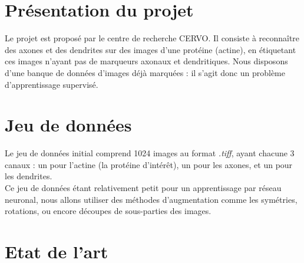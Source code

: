 \documentclass{report}
\begin{document}
\section{Présentation du projet}

Le projet est proposé par le centre de recherche CERVO.  Il consiste à reconnaître
des axones et des dendrites sur des images d’une protéine (actine), en étiquetant ces images
n’ayant pas de marqueurs axonaux et dendritiques. Nous disposons d’une banque de
données d’images déjà marquées : il s'agit donc un problème d’apprentissage supervisé.

\section{Jeu de données}

Le jeu de données initial comprend 1024 images au format \textit{.tiff}, ayant
chacune 3 canaux : un pour l'actine (la protéine d'intérêt), un pour les axones,
et un pour les dendrites. \\
Ce jeu de données étant relativement petit pour un apprentissage par réseau neuronal,
nous allons utiliser des méthodes d'augmentation comme les symétries, rotations, ou
encore découpes de sous-parties des images.

\section{Etat de l'art}
\end{document}
